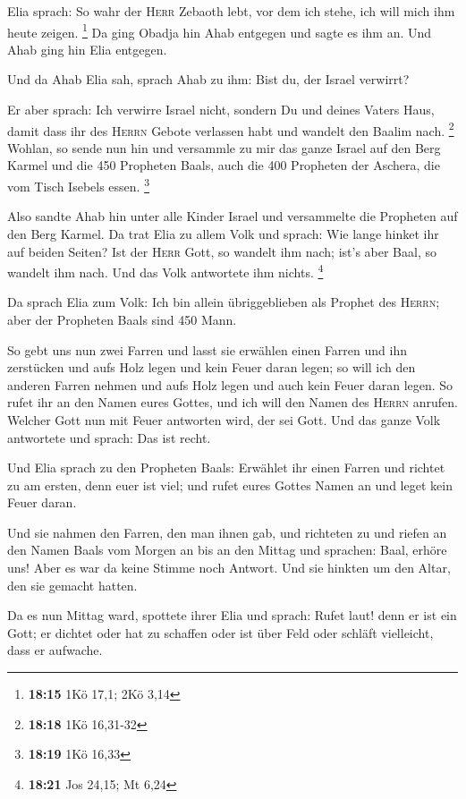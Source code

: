 Elia sprach: So wahr der \textsc{Herr} Zebaoth lebt, vor
dem ich stehe, ich will mich ihm heute zeigen. \footnote{\textbf{18:15}
  1Kö 17,1; 2Kö 3,14}  Da ging Obadja hin Ahab entgegen
und sagte es ihm an. Und Ahab ging hin Elia entgegen.

 Und da Ahab Elia sah, sprach Ahab zu ihm: Bist du, der
Israel verwirrt?

 Er aber sprach: Ich verwirre Israel nicht, sondern Du
und deines Vaters Haus, damit dass ihr des \textsc{Herrn} Gebote
verlassen habt und wandelt den Baalim nach. \footnote{\textbf{18:18} 1Kö
  16,31-32}  Wohlan, so sende nun hin und versammle zu
mir das ganze Israel auf den Berg Karmel und die 450 Propheten Baals,
auch die 400 Propheten der Aschera, die vom Tisch Isebels essen.
\footnote{\textbf{18:19} 1Kö 16,33}

 Also sandte Ahab hin unter alle Kinder Israel und
versammelte die Propheten auf den Berg Karmel.  Da trat
Elia zu allem Volk und sprach: Wie lange hinket ihr auf beiden Seiten?
Ist der \textsc{Herr} Gott, so wandelt ihm nach; ist's aber Baal, so
wandelt ihm nach. Und das Volk antwortete ihm nichts. \footnote{\textbf{18:21}
  Jos 24,15; Mt 6,24}

 Da sprach Elia zum Volk: Ich bin allein übriggeblieben
als Prophet des \textsc{Herrn}; aber der Propheten Baals sind 450 Mann.

 So gebt uns nun zwei Farren und lasst sie erwählen einen
Farren und ihn zerstücken und aufs Holz legen und kein Feuer daran
legen; so will ich den anderen Farren nehmen und aufs Holz legen und
auch kein Feuer daran legen.  So rufet ihr an den Namen
eures Gottes, und ich will den Namen des \textsc{Herrn} anrufen. Welcher
Gott nun mit Feuer antworten wird, der sei Gott. Und das ganze Volk
antwortete und sprach: Das ist recht.

 Und Elia sprach zu den Propheten Baals: Erwählet ihr
einen Farren und richtet zu am ersten, denn euer ist viel; und rufet
eures Gottes Namen an und leget kein Feuer daran.

 Und sie nahmen den Farren, den man ihnen gab, und
richteten zu und riefen an den Namen Baals vom Morgen an bis an den
Mittag und sprachen: Baal, erhöre uns! Aber es war da keine Stimme noch
Antwort. Und sie hinkten um den Altar, den sie gemacht hatten.

 Da es nun Mittag ward, spottete ihrer Elia und sprach:
Rufet laut! denn er ist ein Gott; er dichtet oder hat zu schaffen oder
ist über Feld oder schläft vielleicht, dass er aufwache.

